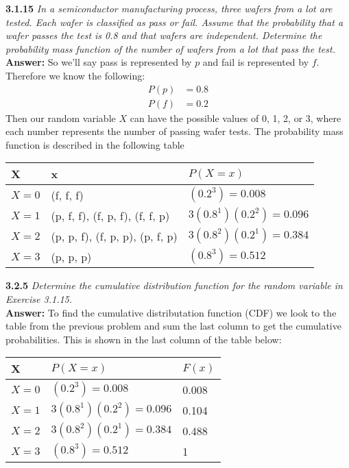 \documentclass[11pt]{article}
\begin{document}
\noindent \textbf{3.1.15} \emph{ In a semiconductor manufacturing process, three wafers from a lot are tested. Each wafer is classified as pass or fail. Assume that the probability that a wafer passes the test is 0.8 and that wafers are independent. Determine the probability mass function of the number of wafers from a lot that pass the test.}
\\\textbf{Answer: } So we'll say pass is represented by $p$ and fail is represented by $f$. Therefore we know the following:
\begin{equation}
\begin{split}
P(p) &= 0.8 \\
P(f) &= 0.2
\end{split}
\end{equation}
Then our random variable $X$ can have the possible values of 0, 1, 2, or 3, where each number represents the number of passing wafer tests. The probability mass function is described in the following table
\begin{center}
\begin{tabular} {l| l| l}
X & x & $P(X = x)$ \\
\hline
$X = 0$ & (f, f, f) & $ (0.2^3) = 0.008$ \\
$X = 1 $& (p, f, f), (f, p, f), (f, f, p)  &  $ 3(0.8^1)(0.2^2) = 0.096$ \\
$X = 2 $& (p, p, f), (f, p, p), (p, f, p) & $3(0.8^2)(0.2^1) = 0.384$ \\
$X = 3 $& (p, p, p) &$ (0.8^3) = 0.512 $
\end{tabular}
\end{center}
\noindent \textbf{3.2.5} \emph{Determine the cumulative distribution function for the random variable in Exercise 3.1.15.}
\\\textbf{Answer: } To find the cumulative distributation function (CDF) we look to the table from the previous problem and sum the last column to get the cumulative probabilities. This is shown in the last column of the table below:
\begin{center}
\begin{tabular} {l| l| l}
X &  $P(X = x)$ & $F(x)$ \\
\hline
$X = 0$ & $ (0.2^3) = 0.008$ & 0.008 \\
$X = 1 $  &  $ 3(0.8^1)(0.2^2) = 0.096$&0.104 \\
$X = 2 $& $3(0.8^2)(0.2^1) = 0.384$ &0.488\\
$X = 3 $&$ (0.8^3) = 0.512$ & 1 
\end{tabular}
\end{center}
\end{document}
